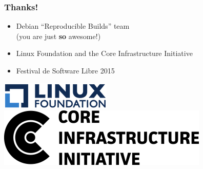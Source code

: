 \documentclass[14pt]{beamer}
\begin{document}
\begin{frame}
 \frametitle{Thanks!}

 \begin{itemize}
  \item Debian “Reproducible Builds” team \\
        {\small (you are just \textbf{so} awesome!)}
  \item Linux Foundation and the Core Infrastructure Initiative
  \item Festival de Software Libre 2015
\end{itemize}

 \begin{center}
  \includegraphics[height=0.1\paperheight]{images/linux_foundation_logo.png}
  \hspace{0.1\paperwidth}
  \includegraphics[height=0.1\paperheight]{images/cii_logo.png}
 \end{center}

 \vfill
 \begin{center}
 \end{center}
\end{frame}
\end{document}
